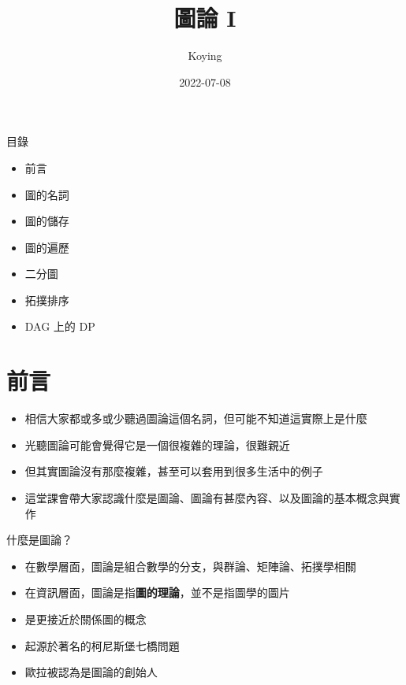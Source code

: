 \documentclass[aspectratio=169]{beamer}
\title{圖論 I}
\author{Koying}
\date{2022-07-08}
\begin{document}
    \begin{frame}
        \titlepage
    \end{frame}

    \begin{frame}{目錄}
        \begin{itemize}
            \item 前言
            \item 圖的名詞
            \item 圖的儲存
            \item 圖的遍歷
            \item 二分圖
            \item 拓撲排序
            \item DAG 上的 DP
        \end{itemize}
    \end{frame}

    \section{前言}

    \begin{frame}
        \begin{itemize}
            \item 相信大家都或多或少聽過圖論這個名詞，但可能不知道這實際上是什麼
            \item 光聽圖論可能會覺得它是一個很複雜的理論，很難親近
            \item 但其實圖論沒有那麼複雜，甚至可以套用到很多生活中的例子
            \item 這堂課會帶大家認識什麼是圖論、圖論有甚麼內容、以及圖論的基本概念與實作
        \end{itemize}
    \end{frame}


    \begin{frame}{什麼是圖論？}
        \begin{itemize}
            \item<1-> 在數學層面，圖論是組合數學的分支，與群論、矩陣論、拓撲學相關
            \item<2-> 在資訊層面，圖論是指\textbf{圖的理論}，並不是指圖學的圖片
            \item<3-> 是更接近於關係圖的概念
            \item<4-> 起源於著名的柯尼斯堡七橋問題
            \item<5-> 歐拉被認為是圖論的創始人
        \end{itemize}
    \end{frame}
\end{document}
